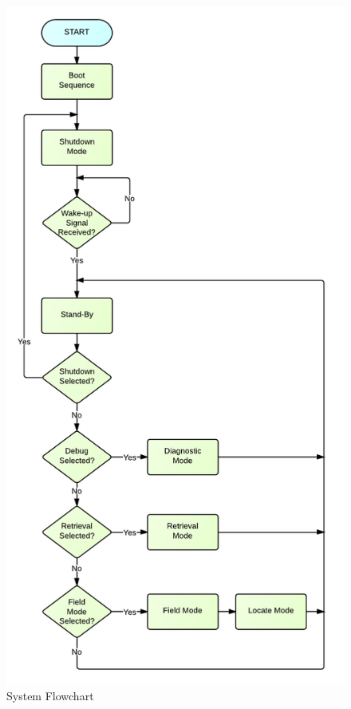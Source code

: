 \begin{figure}[H]
	\centering
	\includegraphics[scale=0.9]{img/SystemFlowchart}
	\caption{System Flowchart \label{fig:systemFlowchart}}
\end{figure}

